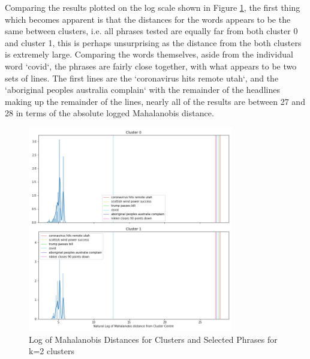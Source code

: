 Comparing the results plotted on the log scale shown in Figure \ref{fig:wordsk2}, the first thing which becomes apparent is that the distances for the words appears to be the same between clusters, i.e. all phrases tested are equally far from both cluster 0 and cluster 1, this is perhaps unsurprising as the distance from the both clusters is extremely large. Comparing the words themselves, aside from the individual word `covid`, the phrases are fairly close together, with what appears to be two sets of lines. The first lines are the `coronavirus hits remote utah`, and the `aboriginal peoples australia complain` with the remainder of the headlines making up the remainder of the lines, nearly all of the results are between 27 and 28 in terms of the absolute logged Mahalanobis distance.  
\begin{figure}[H]
	\centering
	\includegraphics[width=0.8\textwidth]{images/words_kmeans_mahalanobis_distance_k=2.png}
	\caption{Log of Mahalanobis Distances for Clusters and Selected Phrases for k=2 clusters}
	\label{fig:wordsk2}
\end{figure}

